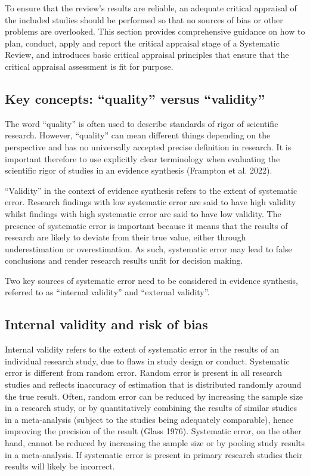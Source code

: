 \documentclass[
  letterpaper,
  DIV=11,
  numbers=noendperiod]{scrreprt}
\begin{document}
To ensure that the review's results are reliable, an adequate critical
appraisal of the included studies should be performed so that no sources
of bias or other problems are overlooked. This section provides
comprehensive guidance on how to plan, conduct, apply and report the
critical appraisal stage of a Systematic Review, and introduces basic
critical appraisal principles that ensure that the critical appraisal
assessment is fit for purpose.

\subsection{Key concepts: ``quality'' versus
``validity''}\label{key-concepts-quality-versus-validity}

The word ``quality'' is often used to describe standards of rigor of
scientific research. However, ``quality'' can mean different things
depending on the perspective and has no universally accepted precise
definition in research. It is important therefore to use explicitly
clear terminology when evaluating the scientific rigor of studies in an
evidence synthesis (Frampton et al. 2022).

``Validity'' in the context of evidence synthesis refers to the extent
of systematic error. Research findings with low systematic error are
said to have high validity whilst findings with high systematic error
are said to have low validity. The presence of systematic error is
important because it means that the results of research are likely to
deviate from their true value, either through underestimation or
overestimation. As such, systematic error may lead to false conclusions
and render research results unfit for decision making.

Two key sources of systematic error need to be considered in evidence
synthesis, referred to as ``internal validity'' and ``external
validity''.

\subsection{\texorpdfstring{\textbf{Internal validity and risk of
bias}}{Internal validity and risk of bias}}\label{internal-validity-and-risk-of-bias}

Internal validity refers to the extent of systematic error in the
results of an individual research study, due to flaws in study design or
conduct. Systematic error is different from random error. Random error
is present in all research studies and reflects inaccuracy of estimation
that is distributed randomly around the true result. Often, random error
can be reduced by increasing the sample size in a research study, or by
quantitatively combining the results of similar studies in a
meta-analysis (subject to the studies being adequately comparable),
hence improving the precision of the result (Glass 1976). Systematic
error, on the other hand, cannot be reduced by increasing the sample
size or by pooling study results in a meta-analysis. If systematic error
is present in primary research studies their results will likely be
incorrect.
\end{document}
